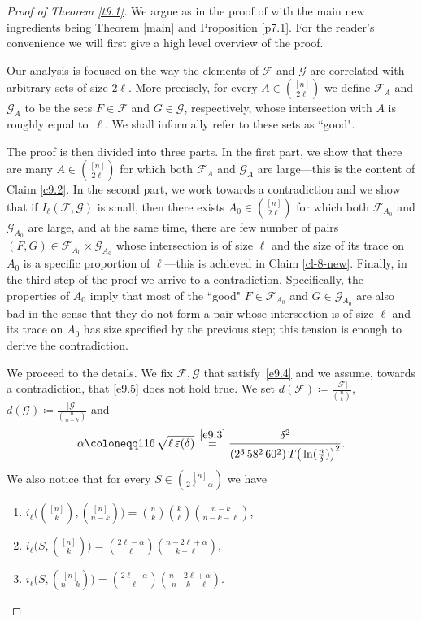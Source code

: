 \documentclass[10pt,a4paper]{amsart}
\theoremstyle{remark}
\newcommand{\Fcal}{\mathcal{F}}
\newcommand{\Gcal}{\mathcal{G}}
\begin{document}
\begin{proof}[Proof of Theorem \emph{\ref{t9.1}}]
We argue as in the proof of \cite[Theorem 1.14]{FR87} with the main new ingredients being
Theorem \ref{main} and Proposition \ref{p7.1}. For the reader's convenience we will first give a high level overview of the proof.

Our analysis is focused on the way the elements of $\Fcal$ and $\Gcal$ are correlated with arbitrary sets of size $2\ell$.
More precisely, for every $A\in\binom{[n]}{2\ell}$ we define $\Fcal_A$ and $\Gcal_A$ to be the sets $F\in \Fcal$
and $G\in \Gcal$, respectively, whose intersection with $A$ is roughly equal to~$\ell$.
We shall informally refer to these sets as ``good"\!.

The proof is then divided into three parts. In the first part, we show that there are many $A\in\binom{[n]}{2\ell}$ for which
both $\Fcal_A$ and $\Gcal_A$ are large---this is the content of Claim \ref{c9.2}. In the second part, we work towards
a contradiction  and we show that if $I_{\ell}(\Fcal,\Gcal)$ is small, then there exists $A_0\in\binom{[n]}{2\ell}$ for which
both $\Fcal_{A_0}$ and $\Gcal_{A_0}$ are large, and at the same time, there are few number of pairs $(F,G)\in\Fcal_{A_0}\times\Gcal_{A_0}$ whose intersection is of size $\ell$ and the size of its trace on $A_0$
is a specific proportion of $\ell$---this is achieved in Claim \ref{cl-8-new}.
Finally, in the third step of the proof we arrive to a contradiction. Specifically, the properties of $A_0$ imply that most of the ``good" $F\in \Fcal_{A_0}$ and $G\in \Gcal_{A_0}$ are also bad in the sense that they do not form a pair whose  intersection is of size $\ell$ and its trace on $A_0$ has size specified by the previous step; this tension is enough to derive
the contradiction.

We proceed to the details. We fix $\Fcal,\Gcal$ that satisfy~\eqref{e9.4} and we assume, towards a contradiction,
that \eqref{e9.5} does not hold true. We set $d(\Fcal)\coloneqq \frac{|\Fcal|}{\binom{n}{k}}$,
$d(\Gcal)\coloneqq\frac{|\Gcal|}{\binom{n}{n-k}}$ and
\begin{equation} \label{e9.6}
\alpha\coloneqq 116\, \sqrt{\ell\,\varepsilon(\delta)}\, \stackrel{\eqref{e9.3}}{=}
\frac{\delta^2}{(2^3\,58^2\,60^2) \, T \big(\ln(\frac{n}{\delta})\big)^2}.
\end{equation}
We also notice that for every $S\in\binom{[n]}{2\ell-\alpha}$ we have
\begin{enumerate}
\item[$\bullet$] $i_{\ell}\big( \binom{[n]}{k},\binom{[n]}{n-k}\big)=\binom{n}{k}\binom{k}{\ell}\binom{n-k}{n-k-\ell}$,
\item[$\bullet$] $i_{\ell}\big(S,\binom{[n]}{k}\big)=\binom{2\ell-\alpha}{\ell}\binom{n-2\ell+\alpha}{k-\ell}$,
\item[$\bullet$] $i_{\ell}\big(S,\binom{[n]}{n-k}\big)=\binom{2\ell-\alpha}{\ell}\binom{n-2\ell+\alpha}{n-k-\ell}$.
\end{enumerate}


\end{proof}
\end{document}
